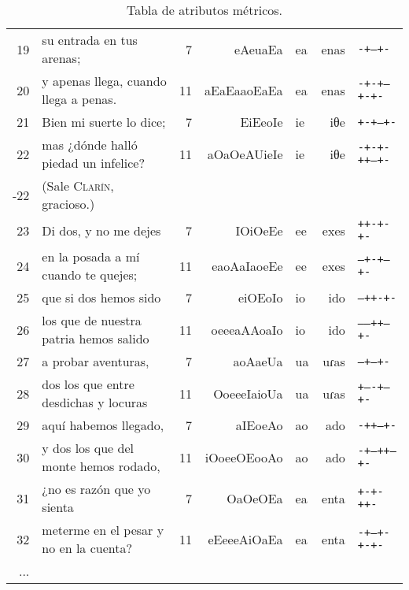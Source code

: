 \begin{table}[!ht]
\begin{tabular}{rp{5.6cm}rrlrl}
19 & su entrada en tus arenas; & 7 &eAeuaEa & ea & enas & \texttt{-+---+-}\\
20 &  y apenas llega, cuando llega a penas. & 11 &aEaEaaoEaEa & ea & enas & \texttt{-+-+---+-+-}\\
21 & Bien mi suerte lo dice; & 7 &EiEeoIe & ie & iθe & \texttt{+-+--+-}\\
22 & mas ¿dónde halló piedad un infelice? & 11 &aOaOeAUieIe & ie & iθe & \texttt{-+-+-++--+-}\\
-22 &(Sale \textsc{Clarín}, gracioso.)&&&&&\\
23 &  Di dos, y no me dejes & 7 &IOiOeEe & ee & exes & \texttt{++-+-+-}\\
24 & en la posada a mí cuando te quejes; & 11 &eaoAaIaoeEe & ee & exes & \texttt{---+-+---+-}\\
25 &  que si dos hemos sido & 7 &eiOEoIo & io & ido & \texttt{--++-+-}\\
26 &  los que de nuestra patria hemos salido & 11 &oeeeaAAoaIo & io & ido & \texttt{-----++--+-}\\
27 & a probar aventuras, & 7 &aoAaeUa & ua & uɾas & \texttt{--+--+-}\\
28 & dos los que entre desdichas y locuras & 11 &OoeeeIaioUa & ua & uɾas & \texttt{+----+---+-}\\
29 &  aquí habemos llegado, & 7 &aIEoeAo & ao & ado & \texttt{-++--+-}\\
30 &  y dos los que del monte hemos rodado, & 11 &iOoeeOEooAo & ao & ado & \texttt{-+---++--+-}\\
31 & ¿no es razón que yo sienta & 7 &OaOeOEa & ea & enta & \texttt{+-+-++-}\\
32 &  meterme en el pesar y no en la cuenta? & 11 &eEeeeAiOaEa & ea & enta & \texttt{-+---+-+-+-}\\
...&&&&&&\\
\bottomrule
\end{tabular}
 \caption{Tabla de atributos métricos.}
        \label{tab:dramatac}
\end{table}
